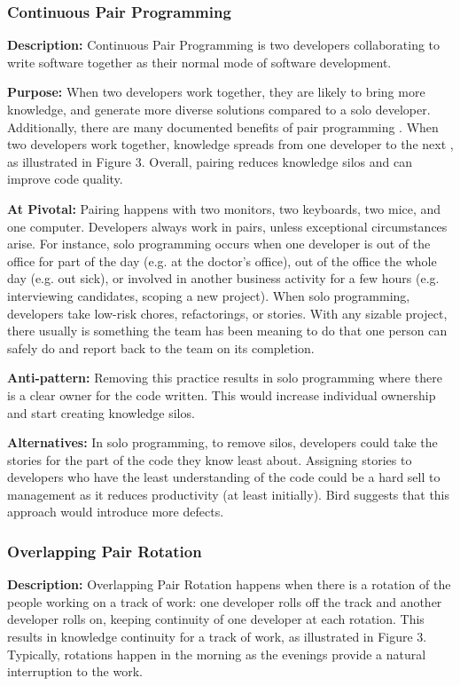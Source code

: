 \subsubsection{Continuous Pair Programming}
\textbf{Description:} Continuous Pair Programming is two developers collaborating to write software together as their normal mode of software development.

\textbf{Purpose:} When two developers work together, they are likely to bring more knowledge, and generate more diverse solutions compared to a solo developer. Additionally, there are many documented benefits of pair programming \cite {Williams2002}. When two developers work together, knowledge spreads from one developer to the next \cite{Zieris2016KnowledgeTransfer}, as illustrated in Figure 3. Overall, pairing reduces knowledge silos and can improve code quality.

\textbf{At Pivotal:} Pairing happens with two monitors, two keyboards, two mice, and one computer. Developers always work in pairs, unless exceptional circumstances arise. For instance, solo programming occurs when one developer is out of the office for part of the day (e.g. at the doctor's office), out of the office the whole day (e.g. out sick), or involved in another business activity for a few hours (e.g. interviewing candidates, scoping a new project). When solo programming, developers take low-risk chores, refactorings, or stories. With any sizable project, there usually is something the team has been meaning to do that one person can safely do and report back to the team on its completion. 

\textbf{Anti-pattern:} Removing this practice results in solo programming where there is a clear owner for the code written. This would increase individual ownership and start creating knowledge silos. 

\textbf{Alternatives:} In solo programming, to remove silos, developers could take the stories for the part of the code they know least about. Assigning stories to developers who have the least understanding of the code could be a hard sell to management as it reduces productivity (at least initially). Bird \cite{BirdDontTouchMyCode} suggests that this approach would introduce more defects. 

\subsubsection{Overlapping Pair Rotation}
\textbf{Description:} Overlapping Pair Rotation happens when there is a rotation of the people working on a track of work: one developer rolls off the track and another developer rolls on, keeping continuity of one developer at each rotation. This results in knowledge continuity for a track of work, as illustrated in Figure 3. Typically, rotations happen in the morning as the evenings provide a natural interruption to the work. 

